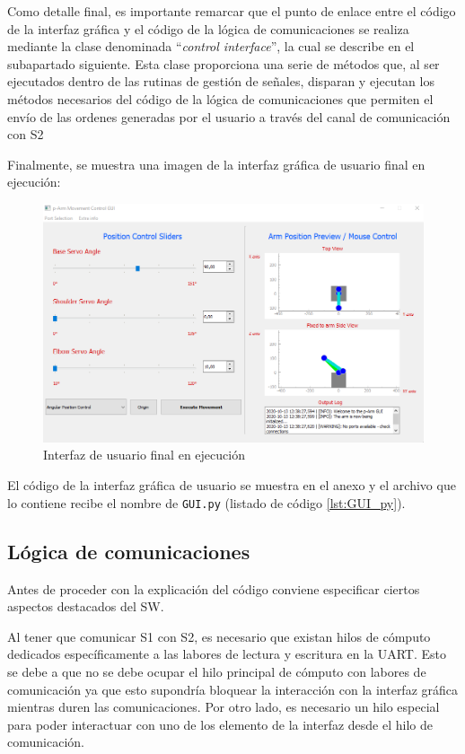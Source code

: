 Como detalle final, es importante remarcar que el punto de enlace entre el código de la interfaz gráfica y el código de la lógica de comunicaciones se realiza mediante la clase denominada  ``\textit{control interface}'', la cual se describe en el subapartado siguiente. Esta clase proporciona una serie de métodos que, al ser ejecutados dentro de las rutinas de gestión de señales, disparan y ejecutan los métodos necesarios del código de la lógica de comunicaciones que permiten el envío de las ordenes generadas por el usuario a través del canal de comunicación con \ac{S2}

Finalmente, se muestra una imagen de la interfaz gráfica de usuario final en ejecución:
\begin{figure}[H]
    \centering
    \includegraphics[width=0.85\linewidth]{pictures/Gui_Final.png}
    \caption{Interfaz de usuario final en ejecución}
    \label{fig:ui_finalexe}
\end{figure}

El código de la interfaz gráfica de usuario se muestra en el anexo y el archivo que lo contiene recibe el nombre de \texttt{GUI.py} (listado de código \ref{lst:GUI_py}).

\subsection{Lógica de comunicaciones}
Antes de proceder con la explicación del código conviene especificar ciertos aspectos destacados del \ac{SW}.

Al tener que comunicar \ac{S1} con \ac{S2}, es necesario que existan hilos de cómputo dedicados específicamente a las labores de lectura y escritura en la UART. Esto se debe a que no se debe ocupar el hilo principal de cómputo con labores de comunicación ya que esto supondría bloquear la interacción con la interfaz gráfica mientras duren las comunicaciones.
Por otro lado, es necesario un hilo especial para poder interactuar con uno de los elemento de la interfaz desde el hilo de comunicación.

